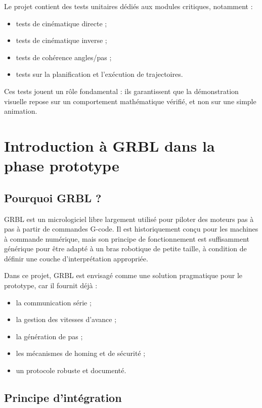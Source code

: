 \documentclass[12pt,a4paper]{report}
\begin{document}
Le projet contient des tests unitaires dédiés aux modules critiques, notamment :

\begin{itemize}
    \item tests de cinématique directe ;
    \item tests de cinématique inverse ;
    \item tests de cohérence angles/pas ;
    \item tests sur la planification et l'exécution de trajectoires.
\end{itemize}

Ces tests jouent un rôle fondamental : ils garantissent que la démonstration visuelle
repose sur un comportement mathématique vérifié, et non sur une simple animation.

\chapter{Introduction à GRBL dans la phase prototype}\label{chap:grbl}

\section{Pourquoi GRBL ?}

GRBL est un micrologiciel libre largement utilisé pour piloter des moteurs pas à pas
à partir de commandes G-code. Il est historiquement conçu pour les machines à commande
numérique, mais son principe de fonctionnement est suffisamment générique pour être
adapté à un bras robotique de petite taille, à condition de définir une couche
d'interprétation appropriée.

Dans ce projet, GRBL est envisagé comme une solution pragmatique pour le prototype,
car il fournit déjà :

\begin{itemize}
    \item la communication série ;
    \item la gestion des vitesses d'avance ;
    \item la génération de pas ;
    \item les mécanismes de homing et de sécurité ;
    \item un protocole robuste et documenté.
\end{itemize}

\section{Principe d'intégration}
\end{document}
